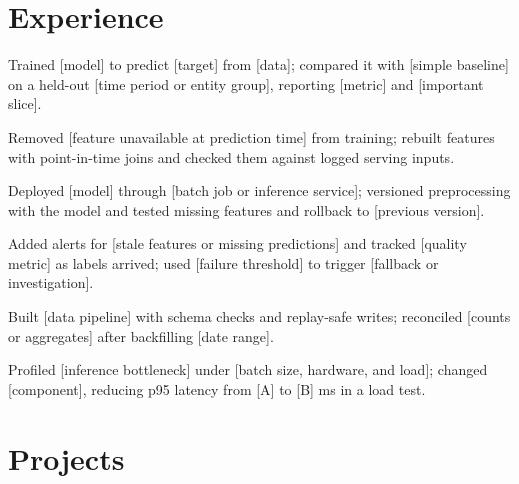 \documentclass{resume}
\begin{document}

\section{Experience}

\begin{jobduties}
  \item Trained [model] to predict [target] from [data]; compared it with [simple baseline] on a held-out [time period or entity group], reporting [metric] and [important slice].
  \item Removed [feature unavailable at prediction time] from training; rebuilt features with point-in-time joins and checked them against logged serving inputs.
  \item Deployed [model] through [batch job or inference service]; versioned preprocessing with the model and tested missing features and rollback to [previous version].
  \item Added alerts for [stale features or missing predictions] and tracked [quality metric] as labels arrived; used [failure threshold] to trigger [fallback or investigation].
\end{jobduties}

\begin{jobduties}
  \item Built [data pipeline] with schema checks and replay-safe writes; reconciled [counts or aggregates] after backfilling [date range].
  \item Profiled [inference bottleneck] under [batch size, hardware, and load]; changed [component], reducing p95 latency from [A] to [B] ms in a load test.
\end{jobduties}

\section{Projects}
\end{document}
